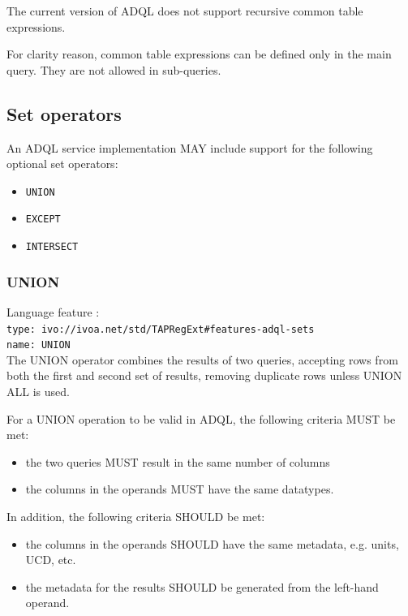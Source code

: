 \documentclass[11pt,a4paper]{ivoa}
\begin{document}
The current version of ADQL does not support recursive common table expressions.

For clarity reason, common table expressions can be defined only in the main
query. They are not allowed in sub-queries.

\subsection{Set operators}
\label{sec:set.operators}

An ADQL service implementation MAY include support for the following optional
set operators:

\begin{itemize}
    \item \verb:UNION:
    \item \verb:EXCEPT:
    \item \verb:INTERSECT:
\end{itemize}

\subsubsection{UNION}
{\footnotesize Language feature :}\\
{\footnotesize \verb|type: ivo://ivoa.net/std/TAPRegExt#features-adql-sets|}\\
{\footnotesize \verb|name: UNION|}\\

The UNION operator combines the results of two queries, accepting rows from
both the first and second set of results,
removing duplicate rows unless UNION ALL is used.

For a UNION operation to be valid in ADQL, the following criteria MUST be met:
\begin{itemize}
    \item the two queries MUST result in the same number of columns
    \item the columns in the operands MUST have the same datatypes.
\end{itemize}

In addition, the following criteria SHOULD be met: 
\begin{itemize}
    \item the columns in the operands SHOULD have the same metadata, e.g. units, UCD, etc.
    \item the metadata for the results SHOULD be generated from the left-hand operand.
\end{itemize}
\end{document}
